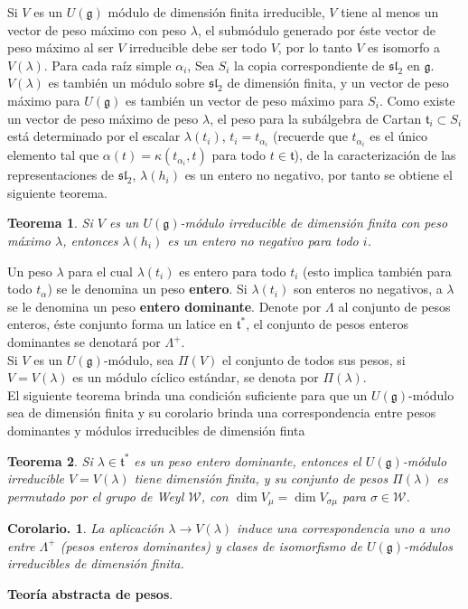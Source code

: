 \documentclass[11pt,a4paper]{article}
\newtheorem{corolary}{Corolario.}
\newtheorem{theorem}{Teorema}
\newcommand{\mfg}{\mathfrak{g}}
\begin{document}
Si $V$ es un $U(\mfg)$ módulo de dimensión finita irreducible, $V$ tiene al menos un vector de peso máximo con peso $\lambda$, el submódulo generado por éste vector de peso máximo al ser $V$ irreducible debe ser todo $V$, por lo tanto $V$ es isomorfo a $V(\lambda)$. Para cada raíz simple  $\alpha_i$, Sea $S_i$ la copia correspondiente de $\mathfrak{sl}_2$ en $\mfg$. $V(\lambda)$ es también  un módulo sobre $\mathfrak{sl_2}$ de dimensión finita, y un vector de peso máximo para $U(\mfg)$ es también un vector de peso máximo para $S_i$. Como existe un vector de peso máximo de  peso $\lambda$, el peso para la subálgebra de Cartan $\mathfrak{t}_i \subset S_i$ está determinado por el escalar $\lambda(t_i)$, $t_i=t_{\alpha_i}$ (recuerde que $t_{\alpha_i}$ es el único elemento tal que $\alpha(t)= \kappa (t_{\alpha_i},t)$ para todo $t\in \mathfrak{t}$), de la caracterización de las representaciones de $\mathfrak{sl}_2$, $\lambda(h_i)$ es un entero no negativo, por tanto se obtiene el siguiente teorema.
\begin{theorem}
Si $V$ es un $U(\mfg)$-módulo irreducible de dimensión finita con peso máximo $\lambda$, entonces $\lambda(h_i)$ es un entero no negativo para todo $i$.
\end{theorem}
Un peso $\lambda$ para el cual  $\lambda(t_i)$ es entero para todo $t_i$ (esto implica también para todo $t_{\alpha}$) se le denomina un peso \textbf{entero}. Si $\lambda(t_i)$ son enteros no negativos, a $\lambda$ se le denomina un  peso \textbf{entero dominante}. Denote por $\Lambda$ al conjunto de pesos enteros, éste conjunto forma un latice en $\mathfrak{t}^*$, el conjunto de pesos enteros dominantes se denotará por $\Lambda^+$.\\
Si $V$ es un  $U(\mfg)$-módulo, sea $\Pi(V)$ el conjunto de todos sus pesos, si $V=V(\lambda)$ es un módulo cíclico estándar, se denota por $\Pi (\lambda)$. \\

El siguiente teorema brinda una condición suficiente para que un $U(\mfg)$-módulo sea de dimensión finita y su corolario brinda una correspondencia entre pesos dominantes y módulos irreducibles de dimensión finta
\begin{theorem}
Si $\lambda \in \mathfrak{t}^*$ es un peso entero dominante, entonces el $U(\mfg)$-módulo irreducible $V=V(\lambda)$ tiene dimensión finita, y su conjunto de pesos $\Pi (\lambda)$ es permutado por el grupo de Weyl $\mathcal{W}$, con $\dim V_{\mu}=\dim V_{\sigma \mu}$ para $\sigma \in \mathcal{W}$.
\end{theorem}
\begin{corolary}
La aplicación $\lambda\rightarrow V(\lambda)$ induce una correspondencia uno a uno entre $\Lambda^+$ (pesos enteros dominantes) y clases de isomorfismo de $U(\mfg)$-módulos irreducibles de dimensión finita.
\end{corolary}
\textbf{Teoría abstracta de pesos}.\\
\end{document}
